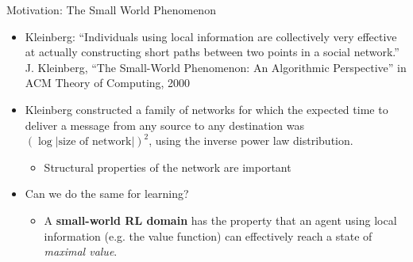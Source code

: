 \vfill
\begin{block}{Motivation: The Small World Phenomenon}
    \begin{itemize}
        \item Kleinberg: ``Individuals using local information are collectively
            very effective at actually constructing short paths between two
            points in a social network.'' \\
            {\small J. Kleinberg, ``The Small-World
            Phenomenon: An Algorithmic Perspective'' in ACM Theory of Computing,
            2000}
        \item Kleinberg constructed a family of networks for which the expected
            time to deliver a message from any source to any destination was
            $( \log |\mbox{size of network}| )^2$, using the inverse power law distribution.
            \begin{itemize}              
                \item Structural properties of the network are important
            \end{itemize}              
        \item Can we do the same for learning?
            \begin{itemize}              
                \item A {\bf small-world RL domain} has the property that an
                    agent using local information (e.g. the value function) can
                    effectively reach a state of {\em maximal value}.
            \end{itemize}              
    \end{itemize}
\end{block}

